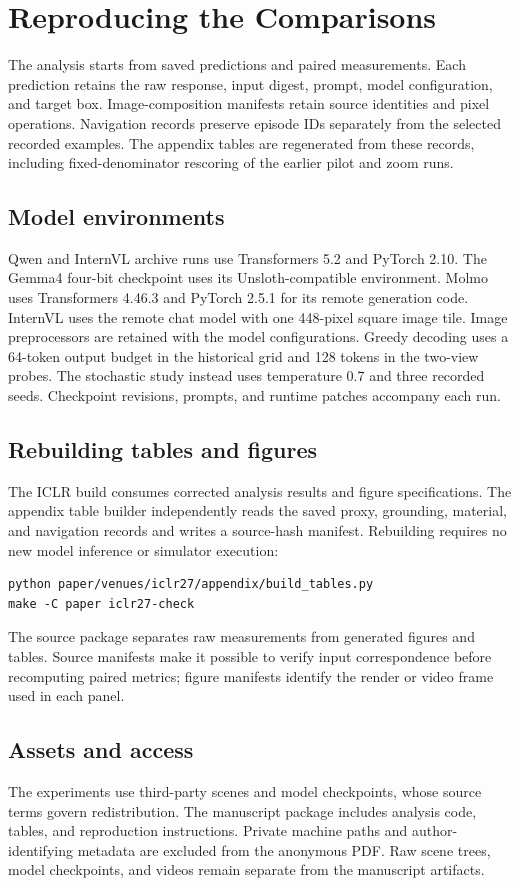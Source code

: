 \section{Reproducing the Comparisons}
\label{app:reproduction}

The analysis starts from saved predictions and paired measurements. Each
prediction retains the raw response, input digest, prompt, model configuration,
and target box. Image-composition manifests retain source identities and pixel
operations. Navigation records preserve episode IDs separately from the
selected recorded examples. The appendix tables are regenerated from these
records, including fixed-denominator rescoring of the earlier pilot and zoom
runs.

\subsection{Model environments}
Qwen and InternVL archive runs use Transformers 5.2 and PyTorch 2.10. The
Gemma4 four-bit checkpoint uses its Unsloth-compatible environment. Molmo uses
Transformers 4.46.3 and PyTorch 2.5.1 for its remote generation code. InternVL
uses the remote chat model with one 448-pixel square image tile. Image
preprocessors are retained with the model configurations. Greedy decoding uses
a 64-token output budget in the historical grid and 128 tokens in the two-view
probes. The stochastic study instead uses temperature 0.7 and three recorded
seeds. Checkpoint revisions, prompts, and runtime patches accompany each run.

\subsection{Rebuilding tables and figures}
The ICLR build consumes corrected analysis results and figure specifications.
The appendix table builder independently reads the saved proxy, grounding,
material, and navigation records and writes a source-hash manifest. Rebuilding
requires no new model inference or simulator execution:
\begin{verbatim}
python paper/venues/iclr27/appendix/build_tables.py
make -C paper iclr27-check
\end{verbatim}
The source package separates raw measurements from generated figures and tables.
Source manifests make it possible to verify input correspondence before
recomputing paired metrics; figure manifests identify the render or video frame
used in each panel.

\subsection{Assets and access}
The experiments use third-party scenes and model checkpoints, whose source
terms govern redistribution. The manuscript package includes analysis code,
tables, and reproduction instructions. Private machine paths and
author-identifying metadata are excluded from the anonymous PDF. Raw scene
trees, model checkpoints, and videos remain separate from the manuscript
artifacts.
